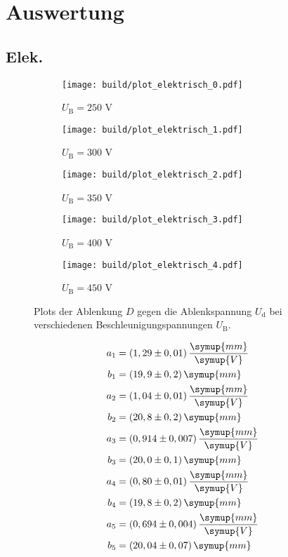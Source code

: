 \section{Auswertung}
\label{sec:Auswertung}

\subsection{Elek.}



\begin{figure}
  \centering
  \begin{subfigure}{0.49\textwidth}
    \centering
    \texttt{[image: build/plot\_elektrisch\_0.pdf]}
    \caption{$U_\text{B} = 250$ V}
  \end{subfigure}
  \begin{subfigure}{0.49\textwidth}
    \centering
    \texttt{[image: build/plot\_elektrisch\_1.pdf]}
    \caption{$U_\text{B} = 300$ V}
  \end{subfigure}

  \begin{subfigure}{0.49\textwidth}
    \centering
    \texttt{[image: build/plot\_elektrisch\_2.pdf]}
    \caption{$U_\text{B} = 350$ V}
  \end{subfigure}
  \begin{subfigure}{0.49\textwidth}
    \centering
    \texttt{[image: build/plot\_elektrisch\_3.pdf]}
    \caption{$U_\text{B} = 400$ V}
  \end{subfigure}

  \begin{subfigure}{0.49\textwidth}
    \centering
    \texttt{[image: build/plot\_elektrisch\_4.pdf]}
    \caption{$U_\text{B} = 450$ V}
  \end{subfigure}
  \caption{Plots der Ablenkung $D$ gegen die Ablenkspannung $U_\text{d}$ bei verschiedenen Beschleunigungspannungen $U_\text{B}$.}
  \label{fig:plot-elektrisch}
\end{figure}



\begin{align*}
  a_1 &= (1,29 \pm 0,01) \, \frac{\symup{mm}}{\symup{V}} \\
  b_1 &= (19,9 \pm 0,2) \, \symup{mm} \\
  a_2 &= (1,04 \pm 0,01) \, \frac{\symup{mm}}{\symup{V}} \\
  b_2 &= (20,8 \pm 0,2) \, \symup{mm} \\
  a_3 &= (0,914 \pm 0,007) \, \frac{\symup{mm}}{\symup{V}} \\
  b_3 &= (20,0 \pm 0,1) \, \symup{mm} \\
  a_4 &= (0,80 \pm 0,01) \, \frac{\symup{mm}}{\symup{V}} \\
  b_4 &= (19,8 \pm 0,2) \, \symup{mm} \\
  a_5 &= (0,694 \pm 0,004) \, \frac{\symup{mm}}{\symup{V}} \\
  b_5 &= (20,04 \pm 0,07) \, \symup{mm}
\end{align*}



